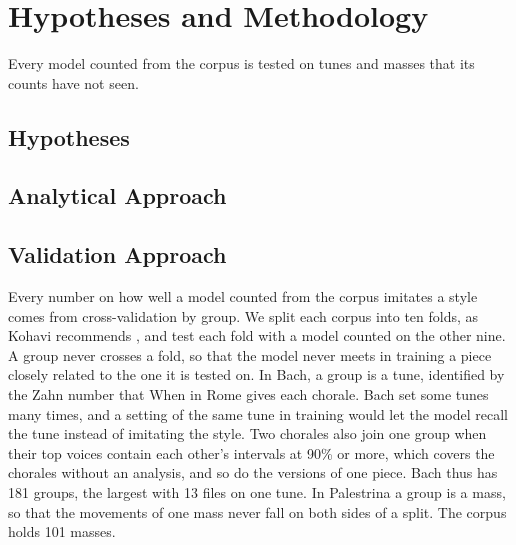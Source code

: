 \section{Hypotheses and Methodology}
\label{sec:method}
Every model counted from the corpus is tested on tunes and masses that its counts have not seen.
\subsection{Hypotheses}


\subsection{Analytical Approach}


\subsection{Validation Approach}

Every number on how well a model counted from the corpus imitates a style comes from cross-validation by group. We split each corpus into ten folds, as Kohavi recommends \cite{kohavi1995}, and test each fold with a model counted on the other nine. A group never crosses a fold, so that the model never meets in training a piece closely related to the one it is tested on. In Bach, a group is a tune, identified by the Zahn number \cite{zahn1889} that When in Rome gives each chorale. Bach set some tunes many times, and a setting of the same tune in training would let the model recall the tune instead of imitating the style. Two chorales also join one group when their top voices contain each other's intervals at 90\% or more, which covers the chorales without an analysis, and so do the versions of one piece. Bach thus has 181 groups, the largest with 13 files on one tune. In Palestrina a group is a mass, so that the movements of one mass never fall on both sides of a split. The corpus holds 101 masses.

